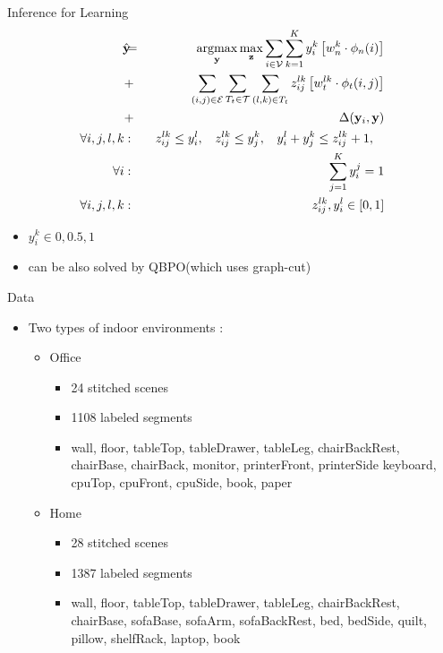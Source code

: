 \documentclass{beamer}
\DeclareMathOperator*{\argmax}{argmax}
\newcommand{\y}{{\mathbf y}}     %
\newcommand{\ysc}[2]{{y_{#1}^{#2}}}    %
\newcommand{\zsc}[2]{{z_{#1}^{#2}}}    %
\newcommand{\fn}[1]{{\phi_n(#1)}}      %
\newcommand{\fe}[3]{{\phi_{#1}(#2,#3)}}%
\newcommand{\wn}[1]{{w_n^{#1}}}        %
\newcommand{\we}[3]{{w_{#1}^{#2#3}}}   %
\newcommand{\loss}[2]{{\Delta(#1,#2)}}   %
\begin{document}
\begin{frame}{Inference for Learning}
 \begin{eqnarray*}
\hat{\y}\!\!\!&=&\!\!\!\argmax_{\y}\max_{\mathbf z} \sum_{i \in \mathcal{V}} \sum_{k=1}^{K} \ysc{i}{k} \left[\wn{k} \cdot \fn{i} \right] \\
&+&  \!\!\!\sum_{(i,j)\in \mathcal{E}}  \sum_{T_t \in {\cal T}} \sum_{(l,k)\in T_t} \zsc{ij}{lk} \left[\we{t}{l}{k} \cdot \fe{t}{i}{j}\right] \\
&+& \loss{\y_i}{\y} \label{eq:relaxobj}\\
\forall i,j,l,k &:& \:\: \zsc{ij}{lk}\le \ysc{i}{l}, \:\:\:\:
\zsc{ij}{lk}\le \ysc{j}{k},\:\:\:\:
\ysc{i}{l} + \ysc{j}{k} \le \zsc{ij}{lk}+1,\:\:\:\: \\
\forall i &:& \sum_{j=1}^{K} y_i^j = 1\\
\forall i,j,l,k &:& \zsc{ij}{lk},\ysc{i}{l} \in [ 0,1 ] \label{eq:relaxconst}
\end{eqnarray*} 

\begin{itemize}
 \item $y_i^k\in{0,0.5,1}$
 \item can be also solved by QBPO(which uses graph-cut)
\end{itemize}

\end{frame}


\begin{frame}{Data}
\begin{itemize}
   \item Two types of indoor environments : 
   \begin{itemize}
   \item Office 
   	\begin{itemize}
	\item 24 stitched scenes
	\item 1108 labeled segments
	\item wall, floor, tableTop, tableDrawer, tableLeg, chairBackRest, chairBase, chairBack, monitor, printerFront, printerSide keyboard, cpuTop, cpuFront, cpuSide, book, paper
	\end{itemize}
   \item Home
   	\begin{itemize}
   	\item  28 stitched scenes
	\item 1387 labeled segments
	\item wall, floor, tableTop, tableDrawer, tableLeg, chairBackRest, chairBase, sofaBase, sofaArm, sofaBackRest, bed, bedSide, quilt, pillow, shelfRack, laptop, book 
	\end{itemize} 
\end{itemize}
\end{itemize}
\end{frame}
\end{document}
